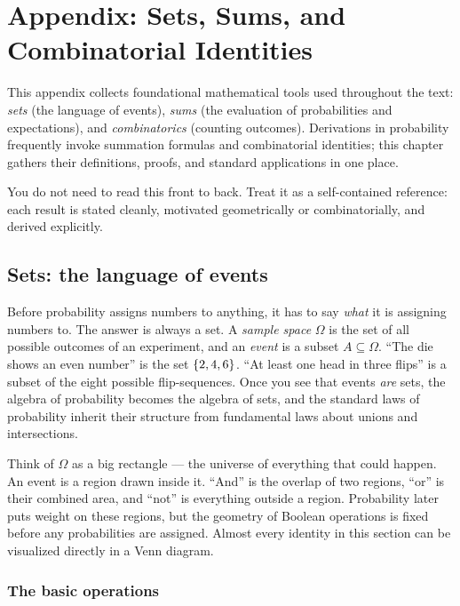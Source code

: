 \chapter{Appendix: Sets, Sums, and Combinatorial Identities}

This appendix collects foundational mathematical tools used throughout the text:
\emph{sets} (the language of events), \emph{sums} (the evaluation of probabilities
and expectations), and \emph{combinatorics} (counting outcomes). Derivations in
probability frequently invoke summation formulas and combinatorial identities;
this chapter gathers their definitions, proofs, and standard applications in one place.

You do not need to read this front to back. Treat it as a self-contained reference:
each result is stated cleanly, motivated geometrically or combinatorially, and
derived explicitly.

\section{Sets: the language of events}
\label{ch39:sets}

Before probability assigns numbers to anything, it has to say \emph{what} it
is assigning numbers to. The answer is always a set. A \emph{sample space}
$\Omega$ is the set of all possible outcomes of an experiment, and an
\emph{event} is a subset $A \subseteq \Omega$. ``The die shows an even
number'' is the set $\{2,4,6\}$. ``At least one head in three flips'' is a
subset of the eight possible flip-sequences. Once you see that events
\emph{are} sets, the algebra of probability becomes the algebra of sets, and
the standard laws of probability inherit their structure from fundamental
laws about unions and intersections.

\begin{intuitionbox}
Think of $\Omega$ as a big rectangle --- the universe of everything that
could happen. An event is a region drawn inside it. ``And'' is the overlap of
two regions, ``or'' is their combined area, and ``not'' is everything outside
a region. Probability later puts weight on these regions, but the
geometry of Boolean operations is fixed before any probabilities are assigned.
Almost every identity in this section can be visualized directly in a Venn diagram.
\end{intuitionbox}

\subsection{The basic operations}

